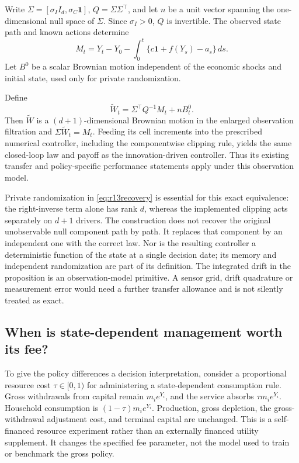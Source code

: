 Write $\Sigma=[\sigma_I I_d,\sigma_C\bm1]$, $Q=\Sigma\Sigma^\top$, and let $n$ be a unit vector spanning the one-dimensional null space of $\Sigma$. Since $\sigma_I>0$, $Q$ is invertible. The observed state path and known actions determine
\[
 M_t=Y_t-Y_0-\int_0^t\{c\bm1+f(Y_s)-a_s\}\,ds.
\]
Let $B^0$ be a scalar Brownian motion independent of the economic shocks and initial state, used only for private randomization.

\begin{proposition}\label{prop:r13observation}
Define
\begin{equation}\label{eq:r13recovery}
 \widetilde W_t=\Sigma^\top Q^{-1}M_t+nB^0_t.
\end{equation}
Then $\widetilde W$ is a $(d+1)$-dimensional Brownian motion in the enlarged observation filtration and $\Sigma\widetilde W_t=M_t$. Feeding its cell increments into the prescribed numerical controller, including the componentwise clipping rule, yields the same closed-loop law and payoff as the innovation-driven controller. Thus its existing transfer and policy-specific performance statements apply under this observation model.
\end{proposition}

Private randomization in \eqref{eq:r13recovery} is essential for this exact equivalence: the right-inverse term alone has rank $d$, whereas the implemented clipping acts separately on $d+1$ drivers. The construction does not recover the original unobservable null component path by path. It replaces that component by an independent one with the correct law. Nor is the resulting controller a deterministic function of the state at a single decision date; its memory and independent randomization are part of its definition. The integrated drift in the proposition is an observation-model primitive. A sensor grid, drift quadrature or measurement error would need a further transfer allowance and is not silently treated as exact.

\subsection{When is state-dependent management worth its fee?}\label{sec:r13fees}
To give the policy differences a decision interpretation, consider a proportional resource cost $\tau\in[0,1)$ for administering a state-dependent consumption rule. Gross withdrawals from capital remain $m_i e^{Y_i}$, and the service absorbs $\tau m_i e^{Y_i}$. Household consumption is $(1-\tau)m_i e^{Y_i}$. Production, gross depletion, the gross-withdrawal adjustment cost, and terminal capital are unchanged. This is a self-financed resource experiment rather than an externally financed utility supplement. It changes the specified fee parameter, not the model used to train or benchmark the gross policy.

